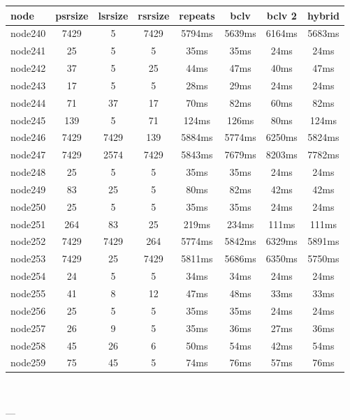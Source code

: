 \begin{tabular}{|l|c|c|c|c|c|c|c|}
\hline node & psrsize & lsrsize & rsrsize   & repeats & bclv & bclv 2 & hybrid\\
    \hline node240 & 7429 & 5 & 7429 & 5794ms & 5639ms & 6164ms & 5683ms\\
    \hline node241 & 25 & 5 & 5 & 35ms & 35ms & 24ms & 24ms\\
    \hline node242 & 37 & 5 & 25 & 44ms & 47ms & 40ms & 47ms\\
    \hline node243 & 17 & 5 & 5 & 28ms & 29ms & 24ms & 24ms\\
    \hline node244 & 71 & 37 & 17 & 70ms & 82ms & 60ms & 82ms\\
    \hline node245 & 139 & 5 & 71 & 124ms & 126ms & 80ms & 124ms\\
    \hline node246 & 7429 & 7429 & 139 & 5884ms & 5774ms & 6250ms & 5824ms\\
    \hline node247 & 7429 & 2574 & 7429 & 5843ms & 7679ms & 8203ms & 7782ms\\
    \hline node248 & 25 & 5 & 5 & 35ms & 35ms & 24ms & 24ms\\
    \hline node249 & 83 & 25 & 5 & 80ms & 82ms & 42ms & 42ms\\
    \hline node250 & 25 & 5 & 5 & 35ms & 35ms & 24ms & 24ms\\
    \hline node251 & 264 & 83 & 25 & 219ms & 234ms & 111ms & 111ms\\
    \hline node252 & 7429 & 7429 & 264 & 5774ms & 5842ms & 6329ms & 5891ms\\
    \hline node253 & 7429 & 25 & 7429 & 5811ms & 5686ms & 6350ms & 5750ms\\
    \hline node254 & 24 & 5 & 5 & 34ms & 34ms & 24ms & 24ms\\
    \hline node255 & 41 & 8 & 12 & 47ms & 48ms & 33ms & 33ms\\
    \hline node256 & 25 & 5 & 5 & 35ms & 35ms & 24ms & 24ms\\
    \hline node257 & 26 & 9 & 5 & 35ms & 36ms & 27ms & 36ms\\
    \hline node258 & 45 & 26 & 6 & 50ms & 54ms & 42ms & 54ms\\
    \hline node259 & 75 & 45 & 5 & 74ms & 76ms & 57ms & 76ms\\

\hline
\end{tabular} \

---


